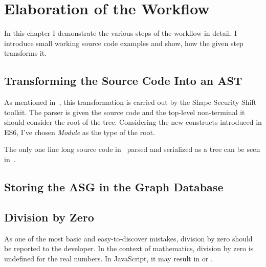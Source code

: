 \chapter{Elaboration of the Workflow}
\label{chap:elaboration-of-the-workflow}

In this chapter I demonstrate the various steps of the workflow in detail. I introduce small working source code examples and show, how the given step transforms it.

\section{Transforming the Source Code Into an AST}
As mentioned in~, this transformation is carried out by the Shape Security Shift toolkit. The parser is given the source code and the top-level non-terminal it should consider the root of the tree. Considering the new constructs introduced in ES6, I've chosen \emph{Module} as the type of the root.

The only one line long source code in~ parsed and serialized as a tree can be seen in~.

\begin{figure}[!htb]
	\begin{minipage}{\textwidth}
		
	\end{minipage}
\end{figure}

\begin{figure}[!htb]
	\begin{minipage}{\textwidth}
		
	\end{minipage}
\end{figure}

\section{Storing the ASG in the Graph Database}

\section{Division by Zero}
As one of the most basic and easy-to-discover mistakes, division by zero should be reported to the developer. In the context of mathematics, division by zero is undefined for the real numbers. In JavaScript, it may result in  or .

